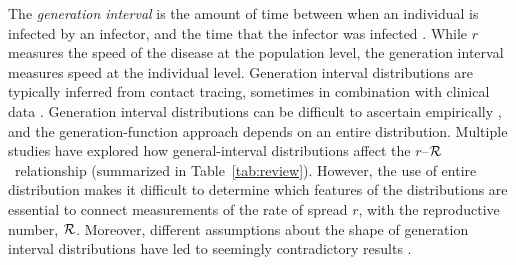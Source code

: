 \documentclass[12pt]{article}
\newcommand{\rR}{\mbox{$r$--$\cal R$}}
\newcommand{\RR}{\ensuremath{{\cal R}}}
\newcommand{\tref}[1]{Table~\ref{tab:#1}}
\begin{document}
The \emph{generation interval} is the amount of time between when an individual is infected by an infector, and the time that the infector was infected \cite{Sven07}.
While $r$ measures the speed of the disease at the population level, the generation interval measures speed at the individual level.
Generation interval distributions are typically inferred from contact tracing, sometimes in combination with clinical data \cite{AylwBarb14,LessOtt16,HubeJohn16}.
Generation interval distributions can be difficult to ascertain empirically \cite{NishCast09,ChamDush15}, and the generation-function approach depends on an entire distribution.
Multiple studies have explored how general-interval distributions affect the \rR\ relationship (summarized in \tref{review}).
However, the use of entire distribution makes it difficult to determine which features of the distributions are essential to connect measurements of the rate of spread $r$, with the reproductive number, \RR.
Moreover,  different assumptions about the shape of generation interval distributions have led to seemingly contradictory results \cite{wearing2005appropriate, roberts2007model}.
\end{document}
